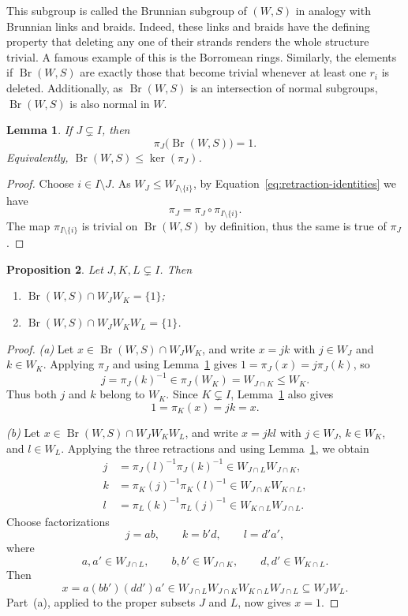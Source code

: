 \documentclass[10pt,a4paper]{amsart}
\newtheorem{prop}{Proposition}[section]
\newtheorem{lemma}[prop]{Lemma}
\newcommand{\Br}{\operatorname{Br}}
\begin{document}
This subgroup is called the Brunnian subgroup of $(W,S)$ in analogy with Brunnian links and braids. Indeed, these links and braids have the defining property that deleting any one of their strands renders the  whole structure trivial. A famous example of this is the Borromean rings. 
Similarly, the elements if $\Br(W,S)$ are exactly those that become trivial whenever at least one $r_i$ is deleted.
Additionally, as $\Br(W,S)$ is an intersection of normal subgroups, $\Br(W,S)$ is also normal in $W$.

\begin{lemma}
\label{lem:pi(Br)trivial}
If $J\subsetneq I$, then
\[
    \pi_J\bigl(\Br(W,S)\bigr)=1.
\]
Equivalently, $\Br(W,S)\leq\ker(\pi_J)$.
\end{lemma}

\begin{proof}
Choose $i\in I\setminus J$. As $W_J\leq W_{I\setminus\{i\}}$, by
Equation~\eqref{eq:retraction-identities} we have
\[
    \pi_J=\pi_J\circ\pi_{I\setminus\{i\}}.
\]
The map $\pi_{I\setminus\{i\}}$ is trivial on $\Br(W,S)$ by definition, thus the
same is true of $\pi_J$.
\end{proof}

\begin{prop}
\label{prop:Brun_intersect}
Let $J,K,L\subsetneq I$.  Then
\begin{enumerate}
    \item $\Br(W,S)\cap W_JW_K=\{1\}$;
    \item $\Br(W,S)\cap W_JW_KW_L=\{1\}$.
\end{enumerate}
\end{prop}

\begin{proof}
\emph{(a)} Let $x\in\Br(W,S)\cap W_JW_K$, and write
$x=jk$ with $j\in W_J$ and $k\in W_K$.  Applying $\pi_J$ and using
Lemma~\ref{lem:pi(Br)trivial} gives
    $1=\pi_J(x)=j\pi_J(k)$,
so
\[
    j=\pi_J(k)^{-1}\in\pi_J(W_K)=W_{J\cap K}\leq W_K.
\]
Thus both $j$ and $k$ belong to $W_K$.  Since $K\subsetneq I$,
Lemma~\ref{lem:pi(Br)trivial} also gives
\[
    1=\pi_K(x)=jk=x.
\]

\emph{(b)} Let $x\in\Br(W,S)\cap W_JW_KW_L$, and write
$x=jkl$ with $j\in W_J$, $k\in W_K$, and $l\in W_L$.  Applying the three
retractions and using Lemma~\ref{lem:pi(Br)trivial}, we obtain
\begin{align*}
    j&=\pi_J(l)^{-1}\pi_J(k)^{-1}
       \in W_{J\cap L}W_{J\cap K},\\
    k&=\pi_K(j)^{-1}\pi_K(l)^{-1}
       \in W_{J\cap K}W_{K\cap L},\\
    l&=\pi_L(k)^{-1}\pi_L(j)^{-1}
       \in W_{K\cap L}W_{J\cap L}.
\end{align*}
Choose factorizations
\[
    j=ab,\qquad k=b'd,\qquad l=d'a',
\]
where
\[
    a,a'\in W_{J\cap L},\qquad
    b,b'\in W_{J\cap K},\qquad
    d,d'\in W_{K\cap L}.
\]
Then
\[
    x=a(bb')(dd')a'\in W_{J\cap L} W_{J\cap K} W_{K\cap L} W_{J\cap L}\subseteq W_JW_L.
\]
Part~(a), applied to the proper subsets $J$ and $L$, now gives $x=1$.
\end{proof}
\end{document}

